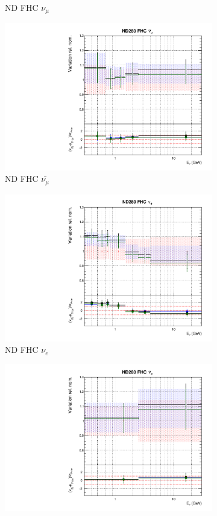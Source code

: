 \begin{figure}
\begin{subfigure}{0.45\textwidth}
  \caption{ND FHC $\nu_{\mu}$}
\end{subfigure}
\begin{subfigure}{0.45\textwidth}
  \centering
  \includegraphics[width=0.75\linewidth]{figs/polydataflux_1}
  \caption{ND FHC $\bar{\nu_{\mu}}$}
\end{subfigure}
\begin{subfigure}{0.45\textwidth}
  \centering
  \includegraphics[width=0.75\linewidth]{figs/polydataflux_2}
  \caption{ND FHC $\nu_e$}
\end{subfigure}
\begin{subfigure}{0.45\textwidth}
  \centering
  \includegraphics[width=0.75\linewidth]{figs/polydataflux_3}

\end{subfigure}
\end{figure}
